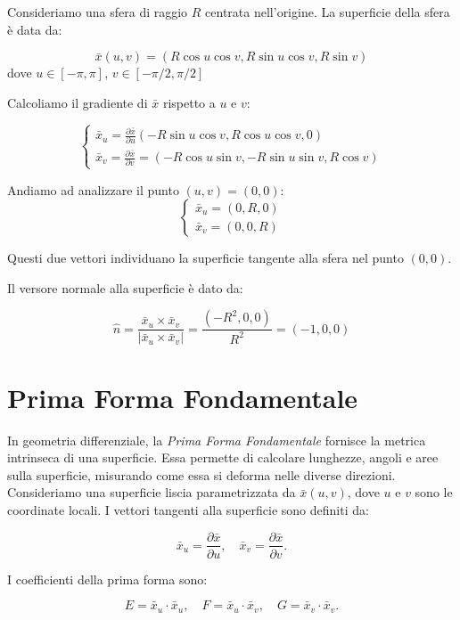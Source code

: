Consideriamo una sfera di raggio $R$ centrata nell'origine. La superficie della sfera è data da:

$$
\bar x(u,v) = (R \cos u \cos v, R \sin u \cos v, R \sin v)
$$
dove $u \in [-\pi, \pi]$, $v \in [-\pi/2, \pi/2]$

\vspace{0.5em}

Calcoliamo il gradiente di $\bar x$ rispetto a $u$ e $v$:

$$
\begin{cases}
\bar x_u = \frac{\partial \bar x}{\partial u} (-R \sin u \cos v, R \cos u \cos v, 0)
\\
\bar x_v = \frac{\partial \bar x}{\partial v} = (-R \cos u \sin v, -R \sin u \sin v, R \cos v)
\end{cases}
$$

Andiamo ad analizzare il punto $(u,v) = (0,0)$:
$$
\begin{cases}
\bar x_u = (0, R, 0)
\\
\bar x_v = (0, 0, R)
\end{cases}
$$

Questi due vettori individuano la superficie tangente alla sfera nel punto $(0,0)$.

Il versore normale alla superficie è dato da:

$$
\hat {n} = \dfrac{\bar x_u \times \bar x_v}{|\bar x_u \times \bar x_v|} = \dfrac{(-R^2, 0, 0)}{R^2} = (-1, 0, 0)
$$

\newpage

\section{Prima Forma Fondamentale}

In geometria differenziale, la \emph{Prima Forma Fondamentale} fornisce la metrica intrinseca di una superficie. Essa permette di calcolare lunghezze, angoli e aree sulla superficie, misurando come essa si deforma nelle diverse direzioni. Consideriamo una superficie liscia parametrizzata da $\bar{x}(u,v)$, dove $u$ e $v$ sono le coordinate locali. I vettori tangenti alla superficie sono definiti da:

$$
\bar{x}_u = \frac{\partial \bar{x}}{\partial u}, \quad \bar{x}_v = \frac{\partial \bar{x}}{\partial v}.
$$

I coefficienti della prima forma sono:

$$
E = \bar{x}_u \cdot \bar{x}_u,\quad F = \bar{x}_u \cdot \bar{x}_v,\quad G = \bar{x}_v \cdot \bar{x}_v.
$$

